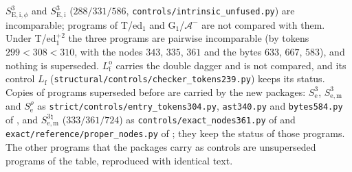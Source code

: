 $S^{3}_{\mathrm{E,i},\phi}$ and $S^{3}_{\mathrm{E,i}}$ ($288/331/586$,
\texttt{controls/intrinsic\_unfused.py}) are incomparable; programs of T/ed$_1$ and
G$_1$/$\mathcal A^{-}$ are not compared with them. Under T/ed$_1^{+2}$ the three programs are
pairwise incomparable (by tokens $299<308<310$, with the nodes $343$, $335$, $361$ and the bytes
$633$, $667$, $583$), and nothing is superseded. $L^{\mathrm o}_{\mathrm f}$ carries the double dagger
and is not compared, and its control $L_{\mathrm f}$ (\texttt{structural/controls/checker\_tokens239.py})
keeps its status. Copies of programs superseded before are carried by the new packages:
$S^{3}_{\mathrm e}$, $S^{3}_{\mathrm{e,m}}$ and $S^{\rho}_{\mathrm e}$ as
\texttt{strict/controls/entry\_tokens304.py}, \texttt{ast340.py} and \texttt{bytes584.py} of
, and $S^{3\natural}_{\mathrm{e,m}}$ ($333/361/724$) as
\texttt{controls/exact\_nodes361.py} of  and
\texttt{exact/reference/proper\_nodes.py} of ; they keep the status
of those programs. The other programs that the packages carry as controls are unsuperseded programs
of the table, reproduced with identical text.

